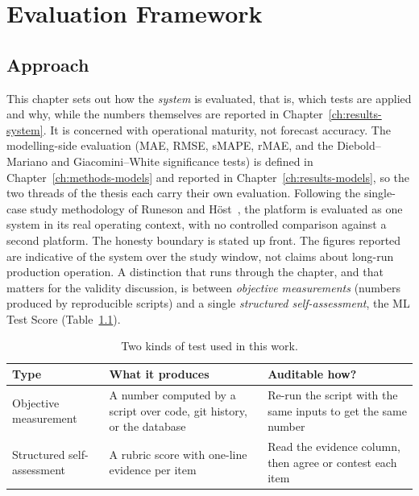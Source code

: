 
\chapter{Evaluation Framework}
\label{ch:eval-framework}

\section{Approach}
\label{sec:ef-approach}

This chapter sets out how the \emph{system} is evaluated, that is, which tests
are applied and why, while the numbers themselves are reported in
Chapter~\ref{ch:results-system}. It is concerned with operational maturity, not
forecast accuracy. The modelling-side evaluation (MAE, RMSE, sMAPE, rMAE, and the
Diebold--Mariano and Giacomini--White significance tests) is defined in
Chapter~\ref{ch:methods-models} and reported in Chapter~\ref{ch:results-models},
so the two threads of the thesis each carry their own evaluation. Following the
single-case study methodology of Runeson and H\"ost~\cite{runeson2009casestudy},
the platform is evaluated as one system in its real operating context, with no
controlled comparison against a second platform. The honesty boundary is
stated up front. The figures reported are indicative of the system over the
study window, not claims about long-run production operation. A distinction that
runs through the chapter, and that matters for the validity discussion, is
between \emph{objective measurements} (numbers produced by reproducible scripts)
and a single \emph{structured self-assessment}, the ML Test Score
(Table~\ref{tab:ef-test-types}).

\begin{table}[h]
  \centering
  \caption{Two kinds of test used in this work.}
  \label{tab:ef-test-types}
  \begin{tabularx}{\linewidth}{@{}l X X@{}}
    \toprule
    \textbf{Type} & \textbf{What it produces} & \textbf{Auditable how?} \\
    \midrule
    Objective measurement   & A number computed by a script over code, git history, or the database & Re-run the script with the same inputs to get the same number \\
    Structured self-assessment & A rubric score with one-line evidence per item & Read the evidence column, then agree or contest each item \\
    \bottomrule
  \end{tabularx}
\end{table}

